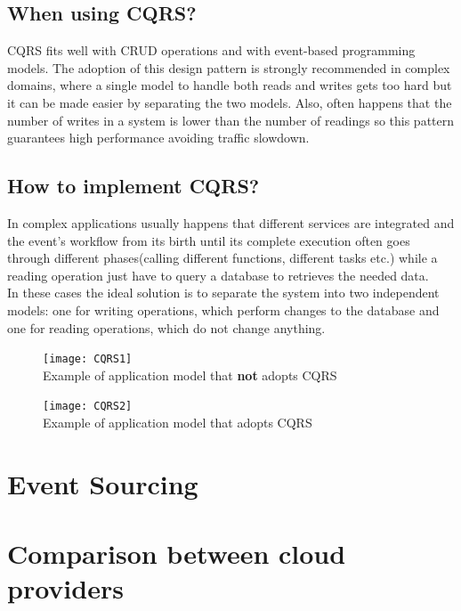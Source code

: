\documentclass[11pt]{article} %
\begin{document}
\subsection{When using CQRS?}
CQRS fits well with CRUD operations and with event-based programming models.
The adoption of this design pattern is strongly recommended in complex domains, where a single model to handle both reads and writes gets too hard but it can be made easier by separating the two models. Also, often happens that the number of writes in a system is lower than the number of readings so this pattern guarantees high performance avoiding traffic slowdown.

\subsection{How to implement CQRS?}
In complex applications usually happens that different services are integrated and the event's workflow from its birth until its complete execution often goes through different phases(calling different functions, different tasks etc.) while a reading operation just have to query a database to retrieves the needed data. \\
In these cases the ideal solution is to separate the system into two independent models: one for writing operations, which perform changes to the database and one for reading operations, which do not change anything.
  
\begin{figure} [H]
  \centering
  \texttt{[image: CQRS1]} \\
  Example of application model that \textbf{not} adopts CQRS
\end{figure}
\begin{figure} [H]
  \centering
  \texttt{[image: CQRS2]} \\
  Example of application model that adopts CQRS \\
\end{figure} 
\newpage
\section{Event Sourcing} 

\newpage
\section{Comparison between cloud providers} 
\end{document}
